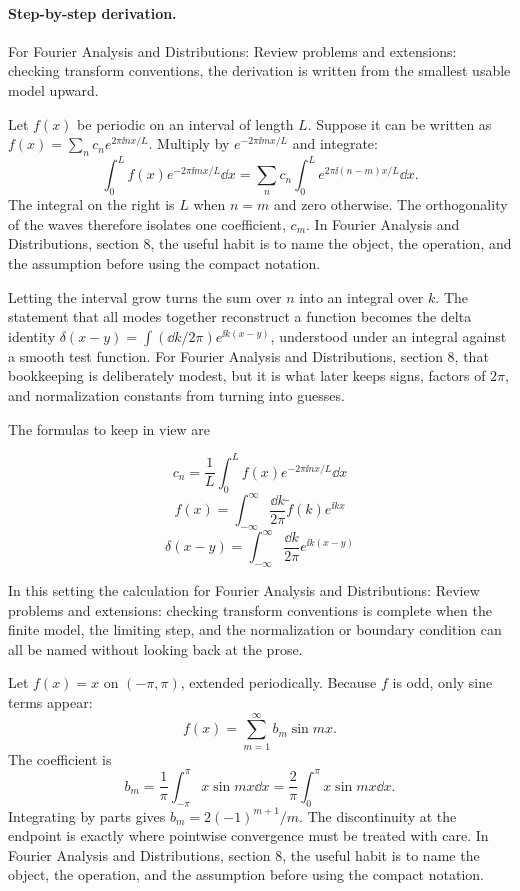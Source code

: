 \paragraph{Step-by-step derivation.}

For Fourier Analysis and Distributions: Review problems and extensions: checking transform conventions, the derivation is written from the smallest usable model upward.

Let \(f(x)\) be periodic on an interval of length \(L\).  Suppose it can be written as \(f(x)=\sum_n c_ne^{2\pi\ii nx/L}\).  Multiply by \(e^{-2\pi\ii mx/L}\) and integrate:
\[
  \int_0^L f(x)e^{-2\pi\ii mx/L}\dd x
  =
  \sum_n c_n\int_0^L e^{2\pi\ii(n-m)x/L}\dd x.
\]
The integral on the right is \(L\) when \(n=m\) and zero otherwise.  The orthogonality of the waves therefore isolates one coefficient, \(c_m\).  In Fourier Analysis and Distributions, section 8, the useful habit is to name the object, the operation, and the assumption before using the compact notation.

Letting the interval grow turns the sum over \(n\) into an integral over \(k\).  The statement that all modes together reconstruct a function becomes the delta identity \(\delta(x-y)=\int(\dd k/2\pi)e^{\ii k(x-y)}\), understood under an integral against a smooth test function.  For Fourier Analysis and Distributions, section 8, that bookkeeping is deliberately modest, but it is what later keeps signs, factors of \(2\pi\), and normalization constants from turning into guesses.

The formulas to keep in view are

\[
  c_n=\frac1L\int_0^L f(x)e^{-2\pi\ii nx/L}\dd x
\]
\[
  f(x)=\int_{-\infty}^{\infty}\frac{\dd k}{2\pi}\tilde f(k)e^{\ii kx}
\]
\[
  \delta(x-y)=\int_{-\infty}^{\infty}\frac{\dd k}{2\pi}e^{\ii k(x-y)}
\]

In this setting the calculation for Fourier Analysis and Distributions: Review problems and extensions: checking transform conventions is complete when the finite model, the limiting step, and the normalization or boundary condition can all be named without looking back at the prose.




\begin{example}
Let \(f(x)=x\) on \((-\pi,\pi)\), extended periodically.  Because \(f\) is odd, only sine terms appear:
\[
  f(x)=\sum_{m=1}^\infty b_m\sin mx.
\]
The coefficient is
\[
  b_m=\frac1\pi\int_{-\pi}^\pi x\sin mx\dd x
  =\frac2\pi\int_0^\pi x\sin mx\dd x.
\]
Integrating by parts gives \(b_m=2(-1)^{m+1}/m\).  The discontinuity at the endpoint is exactly where pointwise convergence must be treated with care.  In Fourier Analysis and Distributions, section 8, the useful habit is to name the object, the operation, and the assumption before using the compact notation.
\end{example}



